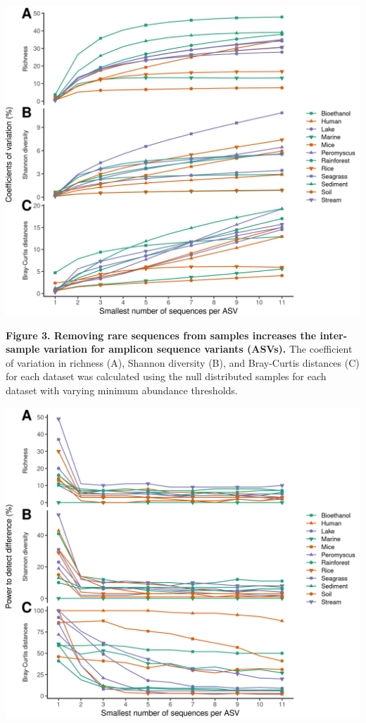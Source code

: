 \documentclass[
]{article}
\begin{document}
\includegraphics{figure_3.png}

\textbf{Figure 3. Removing rare sequences from samples increases the
inter-sample variation for amplicon sequence variants (ASVs).} The
coefficient of variation in richness (A), Shannon diversity (B), and
Bray-Curtis distances (C) for each dataset was calculated using the null
distributed samples for each dataset with varying minimum abundance
thresholds.

\newpage

\includegraphics{figure_4.png}
\end{document}
